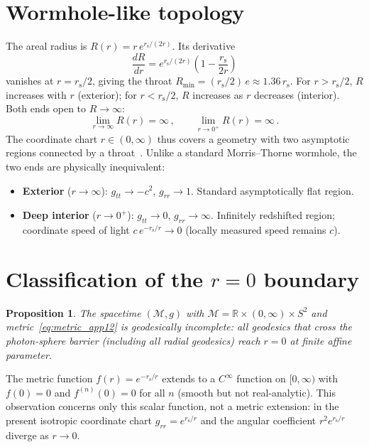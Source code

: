 \documentclass[11pt]{article}
\newcommand{\rs}{r_{\mathrm{s}}}
\newtheorem{proposition}{Proposition}
\begin{document}
\section{Wormhole-like topology}\label{sec:wormhole}

The areal radius is
$R(r) = r\,e^{\rs/(2r)}$.  Its derivative
\begin{equation}
  \frac{dR}{dr} = e^{\rs/(2r)}
  \!\left(1 - \frac{\rs}{2r}\right)
\end{equation}
vanishes at $r = \rs/2$, giving the throat
$R_{\min} = (\rs/2)\,e \approx 1.36\,\rs$.  For
$r > \rs/2$, $R$ increases with $r$ (exterior);
for $r < \rs/2$, $R$ increases as $r$ decreases
(interior).  Both ends open to $R \to \infty$:
\begin{equation}
  \lim_{r\to\infty} R(r) = \infty\,,
  \qquad
  \lim_{r\to 0^{+}} R(r) = \infty\,.
\end{equation}
The coordinate chart $r \in (0,\infty)$ thus covers
a geometry with two asymptotic regions
connected by a throat~\cite{Boonserm2020}.
Unlike a standard Morris--Thorne wormhole, the two
ends are physically inequivalent:
\begin{itemize}
\item \textbf{Exterior} ($r \to \infty$):
  $g_{tt} \to -c^{2}$, $g_{rr} \to 1$.
  Standard asymptotically flat region.
\item \textbf{Deep interior} ($r \to 0^{+}$):
  $g_{tt} \to 0$, $g_{rr} \to \infty$.
  Infinitely redshifted region; coordinate speed
  of light $c\,e^{-\rs/r} \to 0$ (locally measured
  speed remains $c$).
\end{itemize}


\section{Classification of the $r = 0$ boundary}
\label{sec:boundary}

\begin{proposition}\label{prop:incomplete}
The spacetime $(\mathcal{M}, g)$ with
$\mathcal{M} = \mathbb{R}\times(0,\infty)
\times S^{2}$ and metric~\eqref{eq:metric_app12} is
geodesically incomplete: all geodesics that cross the
photon-sphere barrier (including all radial geodesics)
reach $r = 0$ at finite affine parameter.
\end{proposition}

The metric function
$f(r) = e^{-\rs/r}$ extends to a $C^{\infty}$
function on $[0,\infty)$ with $f(0) = 0$ and
$f^{(n)}(0) = 0$ for all $n$ (smooth but not
real-analytic).  This observation concerns only this scalar
function, not a metric extension: in the present isotropic
coordinate chart $g_{rr}=e^{\rs/r}$ and the angular
coefficient $r^{2}e^{\rs/r}$ diverge as $r\to0$.
\end{document}
